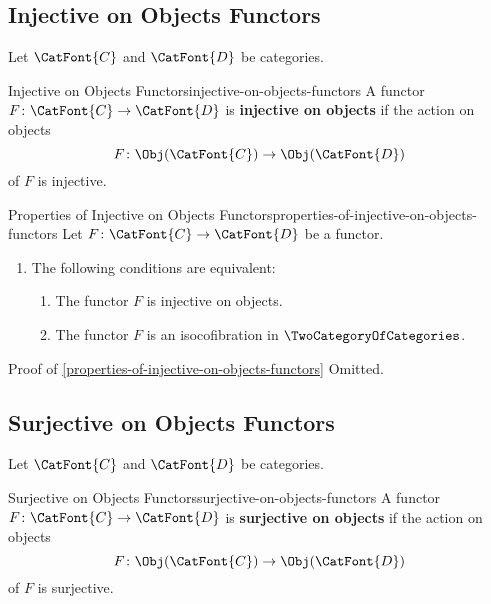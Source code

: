 \subsection{Injective on Objects Functors}\label{subsection-injective-on-objects-functors}
Let $\CatFont{C}$ and $\CatFont{D}$ be categories.
\begin{definition}{Injective on Objects Functors}{injective-on-objects-functors}%
    A functor $F\colon\CatFont{C}\to\CatFont{D}$ is \textbf{injective on objects} if the action on objects
    \[
        F%
        \colon%
        \Obj(\CatFont{C})%
        \to%
        \Obj(\CatFont{D})%
    \]%
    of $F$ is injective.
\end{definition}
\begin{proposition}{Properties of Injective on Objects Functors}{properties-of-injective-on-objects-functors}%
    Let $F\colon\CatFont{C}\to\CatFont{D}$ be a functor.
    \begin{enumerate}
        \item\label{properties-of-injective-on-objects-functors-characterisations}The following conditions are equivalent:
            \begin{enumerate}
                \item\label{properties-of-injective-on-objects-functors-characterisations-a}The functor $F$ is injective on objects.
                \item\label{properties-of-injective-on-objects-functors-characterisations-b}The functor $F$ is an isocofibration in $\TwoCategoryOfCategories$.
            \end{enumerate}
    \end{enumerate}
\end{proposition}
\begin{Proof}{Proof of \cref{properties-of-injective-on-objects-functors}}%
    Omitted.
\end{Proof}
\subsection{Surjective on Objects Functors}\label{subsection-surjective-on-objects-functors}
Let $\CatFont{C}$ and $\CatFont{D}$ be categories.
\begin{definition}{Surjective on Objects Functors}{surjective-on-objects-functors}%
    A functor $F\colon\CatFont{C}\to\CatFont{D}$ is \textbf{surjective on objects} if the action on objects
    \[
        F%
        \colon%
        \Obj(\CatFont{C})%
        \to%
        \Obj(\CatFont{D})%
    \]%
    of $F$ is surjective.
\end{definition}
